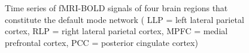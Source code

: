 \documentclass[%
 reprint,
 amsmath,amssymb,
 aps,
]{revtex4-1}
\begin{document}
\begin{figure}[H]
\begin{center}
\caption{Time series of fMRI-BOLD signals of four brain regions that constitute the default mode network ( LLP = left lateral parietal cortex, RLP = right lateral parietal cortex, MPFC = medial prefrontal cortex, PCC = posterior cingulate cortex) }\label{fig:subject4}
\end{center}
\end{figure}
\end{document}

